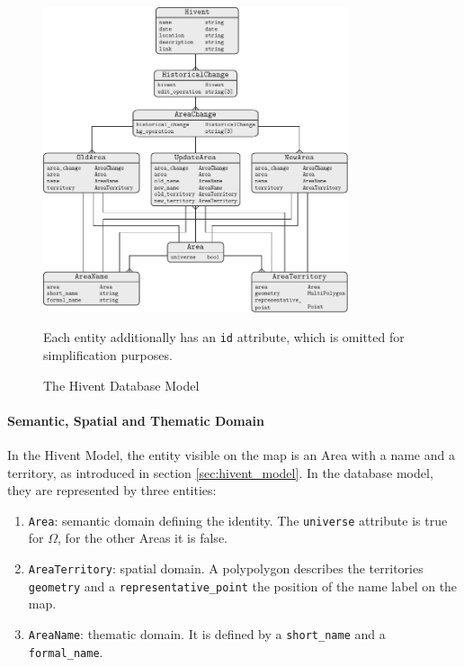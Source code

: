 \begin{figure}[ht]
  \centering
  \includegraphics[width=0.8\textwidth]{graphics/development/database_model/er_model}
  \caption{The Hivent Database Model}
  \small{Each entity additionally has an \texttt{id} attribute, which is omitted for simplification purposes.}
  \label{fig:database_model_er}
\end{figure}

\paragraph{Semantic, Spatial and Thematic Domain} %
\label{par:semantic_spatial_and_thematic_domain}

In the Hivent Model, the entity visible on the map is an Area with a name and a territory, as introduced in section \ref{sec:hivent_model}. In the database model, they are represented by three entities:

\begin{enumerate}
  \item \texttt{Area}: semantic domain defining the identity. The \texttt{universe} attribute is true for $\Omega$, for the other Areas it is false.
  \item \texttt{AreaTerritory}: spatial domain. A polypolygon describes the territories \texttt{geometry} and a \texttt{representative\_point} the position of the name label on the map.
  \item \texttt{AreaName}: thematic domain. It is defined by a \texttt{short\_name} and a \texttt{formal\_name}.
\end{enumerate}

